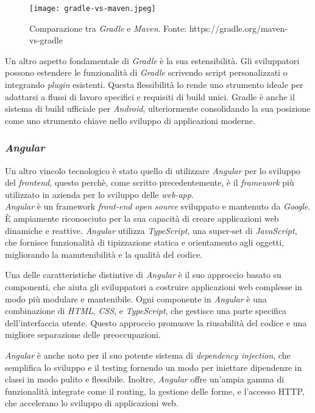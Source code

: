  \begin{figure}[!h] 
  \centering 
  \texttt{[image: gradle-vs-maven.jpeg]} 
  \caption{Comparazione tra \textit{Gradle} e \textit{Maven}. Fonte: https://gradle.org/maven-vs-gradle}
  \label{fig:gredle-vs-maven}
\end{figure}

Un altro aspetto fondamentale di \textit{Gradle} è la sua estensibilità. Gli sviluppatori possono estendere le funzionalità di \textit{Gradle} 
scrivendo script personalizzati o integrando \textit{plugin} esistenti. Questa flessibilità lo rende uno strumento ideale per adattarsi a 
flussi di lavoro specifici e requisiti di build unici. Gradle è anche il sistema di build ufficiale per \textit{Android}, ulteriormente 
consolidando la sua posizione come uno strumento chiave nello sviluppo di applicazioni moderne.

\subsubsection*{\textit{Angular}}
Un altro vincolo tecnologico è stato quello di utilizzare \textit{Angular} per lo sviluppo del \textit{frontend}, 
questo perchè, come scritto precedentemente, è il \textit{framework} più utilizzato in azienda per lo sviluppo delle \textit{web-app}.\\

\textit{Angular} è un framework \textit{front-end} \textit{open source} sviluppato e mantenuto da \textit{Google}. 
È ampiamente riconosciuto per la sua capacità di creare applicazioni web dinamiche e reattive. 
\textit{Angular} utilizza \textit{TypeScript}, una super-set di \textit{JavaScript}, che fornisce funzionalità di tipizzazione statica e 
orientamento agli oggetti, migliorando la manutenibilità e la qualità del codice.

Una delle caratteristiche distintive di \textit{Angular} è il suo approccio basato su componenti, che aiuta gli sviluppatori a 
costruire applicazioni web complesse in modo più modulare e mantenibile. Ogni componente in \textit{Angular} è una combinazione di \textit{HTML}, 
\textit{CSS}, e \textit{TypeScript}, che gestisce una parte specifica dell'interfaccia utente. Questo approccio promuove la riusabilità 
del codice e una migliore separazione delle preoccupazioni.

\textit{Angular} è anche noto per il suo potente sistema di \textit{dependency injection}, che semplifica lo sviluppo e il testing fornendo un 
modo per iniettare dipendenze in classi in modo pulito e flessibile. Inoltre, \textit{Angular} offre un'ampia gamma di funzionalità integrate come il 
routing, la gestione delle forme, e l'accesso HTTP, che accelerano lo sviluppo di applicazioni web.

